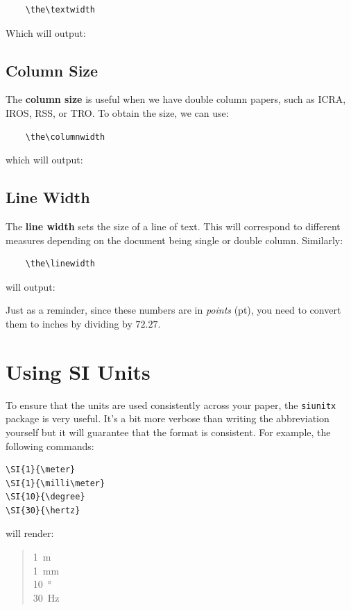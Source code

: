 \documentclass[letterpaper, 10 pt, conference]{ieeeconf}  %
\begin{document}
\begin{verbatim}
    \the\textwidth
\end{verbatim}
Which will output:
%
\begin{quotation}
\the\textwidth
\end{quotation}

\subsection{Column Size}
The \textbf{column size} is useful when we have double column papers, such as ICRA, IROS, RSS, or TRO. To obtain the size, we can use:
\begin{verbatim}
    \the\columnwidth
\end{verbatim}
which will output:
%
\begin{quotation}
\the\columnwidth
\end{quotation}

\subsection{Line Width}
The \textbf{line width} sets the size of a line of text. This will correspond to different measures depending on the document being single or double column. Similarly:
\begin{verbatim}
    \the\linewidth
\end{verbatim}
will output:
%
\begin{quotation}
    \the\linewidth
\end{quotation}

Just as a reminder, since these numbers are in \emph{points} (pt), you need to convert them to inches by dividing by $72.27$.

\section{Using SI Units}
To ensure that the units are used consistently across your paper, the \texttt{siunitx} package is very useful. It's a bit more verbose than writing the abbreviation yourself but it will guarantee that the format is consistent. For example, the following commands:

\begin{verbatim}
\SI{1}{\meter}
\SI{1}{\milli\meter}
\SI{10}{\degree}
\SI{30}{\hertz}
\end{verbatim}
will render:

\begin{quotation}
\noindent\SI{1}{\meter}\\
\SI{1}{\milli\meter}\\
\SI{10}{\degree}\\
\SI{30}{\hertz}\\
\end{quotation}
\end{document}
